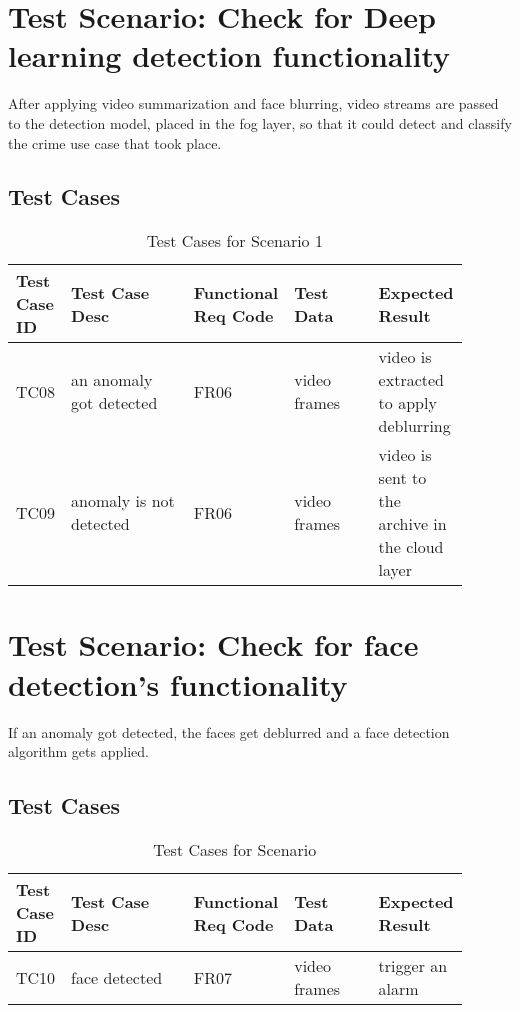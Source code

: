 \documentclass[12pt]{article}
\begin{document}
\section{Test Scenario: Check for Deep learning detection functionality}\label{sec:TSy}
After applying video summarization and face blurring, video streams are passed to the detection model, placed in the fog layer, so that it could detect and classify the crime use case that took place. 
\subsection{Test Cases}
\begin{table}[h]
\caption{Test Cases for Scenario 1}
\label{tab:TC1}
\begin{tabular}{|p{0.1\linewidth}|p{0.3\linewidth}|p{0.1\linewidth}|p{0.2\linewidth}|p{0.2\linewidth}|}
\hline
Test Case ID & Test Case Desc & Functional Req Code & Test Data & Expected Result \\ \hline
TC08  & an anomaly got detected & FR06 &  video frames   & video is extracted to apply deblurring                \\ \hline
TC09 & anomaly is not detected   & FR06    &  video frames      &  video is sent to the archive in the cloud layer         \\ \hline

\end{tabular}
\end{table}
\newpage
\section{Test Scenario: Check for face detection's functionality}\label{sec:TSy}
If an anomaly got detected, the faces get deblurred and a face detection algorithm gets applied.
\subsection{Test Cases}
\begin{table}[h]
\caption{Test Cases for Scenario}
\label{tab:TC1}
\begin{tabular}{|p{0.1\linewidth}|p{0.3\linewidth}|p{0.1\linewidth}|p{0.2\linewidth}|p{0.2\linewidth}|}
\hline
Test Case ID & Test Case Desc & Functional Req Code & Test Data & Expected Result \\ \hline
TC10  & face detected & FR07 &  video frames   & trigger an alarm                \\ \hline

\end{tabular}
\end{table}
\end{document}
